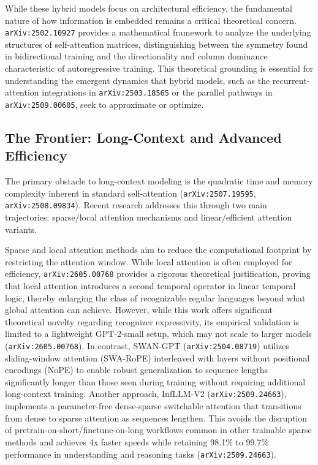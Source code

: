 \documentclass[11pt]{article}
\begin{document}
While these hybrid models focus on architectural efficiency, the fundamental nature of how information is embedded remains a critical theoretical concern. \texttt{arXiv:2502.10927} provides a mathematical framework to analyze the underlying structures of self-attention matrices, distinguishing between the symmetry found in bidirectional training and the directionality and column dominance characteristic of autoregressive training. This theoretical grounding is essential for understanding the emergent dynamics that hybrid models, such as the recurrent-attention integrations in \texttt{arXiv:2503.18565} or the parallel pathways in \texttt{arXiv:2509.00605}, seek to approximate or optimize.

\subsection{The Frontier: Long-Context and Advanced Efficiency}

The primary obstacle to long-context modeling is the quadratic time and memory complexity inherent in standard self-attention (\texttt{arXiv:2507.19595}, \texttt{arXiv:2508.09834}). Recent research addresses this through two main trajectories: sparse/local attention mechanisms and linear/efficient attention variants.

Sparse and local attention methods aim to reduce the computational footprint by restricting the attention window. While local attention is often employed for efficiency, \texttt{arXiv:2605.00768} provides a rigorous theoretical justification, proving that local attention introduces a second temporal operator in linear temporal logic, thereby enlarging the class of recognizable regular languages beyond what global attention can achieve. However, while this work offers significant theoretical novelty regarding recognizer expressivity, its empirical validation is limited to a lightweight GPT-2-small setup, which may not scale to larger models (\texttt{arXiv:2605.00768}). In contrast, SWAN-GPT (\texttt{arXiv:2504.08719}) utilizes sliding-window attention (SWA-RoPE) interleaved with layers without positional encodings (NoPE) to enable robust generalization to sequence lengths significantly longer than those seen during training without requiring additional long-context training. Another approach, InfLLM-V2 (\texttt{arXiv:2509.24663}), implements a parameter-free dense-sparse switchable attention that transitions from dense to sparse attention as sequences lengthen. This avoids the disruption of pretrain-on-short/finetune-on-long workflows common in other trainable sparse methods and achieves 4x faster speeds while retaining 98.1\% to 99.7\% performance in understanding and reasoning tasks (\texttt{arXiv:2509.24663}).
\end{document}
